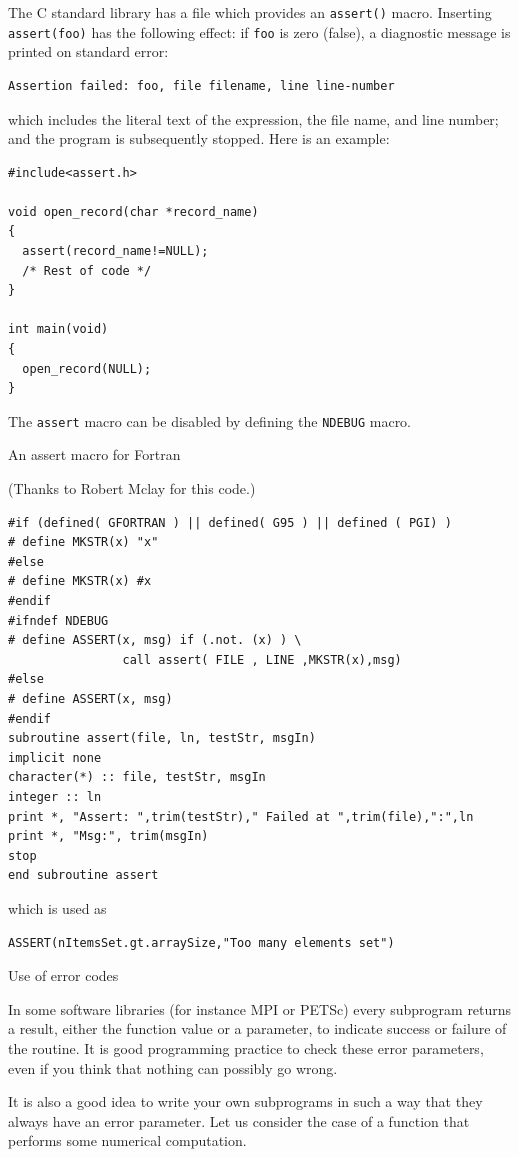 The C standard library has a file  which provides an
\lstinline{assert()} macro.
Inserting \lstinline{assert(foo)} has the following effect:
if \lstinline{foo} is zero (false), a diagnostic message is printed
on standard error:
\begin{lstlisting}[language=shell]
Assertion failed: foo, file filename, line line-number
\end{lstlisting}
which includes the literal text of the expression, 
the file name, and line number; and the program is subsequently stopped.
Here is an example:
\begin{lstlisting}
#include<assert.h>

void open_record(char *record_name)
{
  assert(record_name!=NULL);
  /* Rest of code */
}

int main(void)
{
  open_record(NULL);
}
\end{lstlisting}
The \lstinline{assert} macro can be disabled by defining the
\lstinline{NDEBUG} macro.

 {An assert macro for Fortran}

(Thanks to Robert Mclay for this code.)

\begin{lstlisting}
#if (defined( GFORTRAN ) || defined( G95 ) || defined ( PGI) )
# define MKSTR(x) "x"
#else
# define MKSTR(x) #x
#endif
#ifndef NDEBUG
# define ASSERT(x, msg) if (.not. (x) ) \
                call assert( FILE , LINE ,MKSTR(x),msg)
#else
# define ASSERT(x, msg)
#endif
subroutine assert(file, ln, testStr, msgIn)
implicit none
character(*) :: file, testStr, msgIn
integer :: ln
print *, "Assert: ",trim(testStr)," Failed at ",trim(file),":",ln
print *, "Msg:", trim(msgIn)
stop
end subroutine assert
\end{lstlisting}
which is used as
\begin{lstlisting}
ASSERT(nItemsSet.gt.arraySize,"Too many elements set")
\end{lstlisting}


 {Use of error codes}

In some software libraries (for instance MPI or PETSc) every subprogram
returns a result, either the function value or a parameter, to
indicate success or failure of the routine. It is good programming
practice to check these error parameters, even if you think that
nothing can possibly go wrong.

It is also a good idea to write your own subprograms in such a way
that they always have an error parameter. Let us consider the case of
a function that performs some numerical computation.

